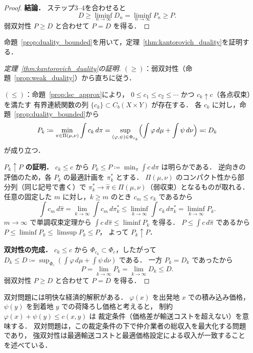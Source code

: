 \documentclass[uplatex, dvipdfmx]{jsarticle}
\begin{document}
\begin{proof}
\textbf{結論．}
ステップ3--4を合わせると
\[
  D \ge \liminf_{n\to\infty} D_n
  = \liminf_{n\to\infty} P_n
  \ge P.
\]
弱双対性 $P\ge D$ と合わせて $P=D$ を得る．
\end{proof}

命題~\ref{prop:duality_bounded}を用いて，定理~\ref{thm:kantorovich_duality}を証明する．

\begin{proof}[定理~\ref{thm:kantorovich_duality}の証明]
$(\ge)$：弱双対性（命題~\ref{prop:weak_duality}）から直ちに従う．

$(\le)$：命題~\ref{prop:lsc_approx}により，
$0\le c_1\le c_2\le\cdots$ かつ $c_k\uparrow c$（各点収束）を満たす
有界連続関数の列 $\{c_k\}\subset C_b(X\times Y)$ が存在する．
各 $c_k$ に対し，命題~\ref{prop:duality_bounded}から
\[
  P_k\coloneqq\min_{\pi\in\Pi(\mu,\nu)}\int c_k\,d\pi
  = \sup_{(\varphi,\psi)\in\Phi_{c_k}}
  \Bigl(\int\varphi\,d\mu+\int\psi\,d\nu\Bigr)
  \eqqcolon D_k
\]
が成り立つ．

\textbf{$P_k\uparrow P$ の証明．}
$c_k\le c$ から $P_k\le P\coloneqq\min_\pi\int c\,d\pi$ は明らかである．
逆向きの評価のため，各 $P_k$ の最適計画を $\pi_k^*$ とする．
$\Pi(\mu,\nu)$ のコンパクト性から部分列（同じ記号で書く）で
$\pi_k^*\to\hat{\pi}\in\Pi(\mu,\nu)$（弱収束）となるものが取れる．
任意の固定した $m$ に対し，$k\ge m$ のとき $c_m\le c_k$ であるから
\[
  \int c_m\,d\hat{\pi}
  = \lim_{k\to\infty}\int c_m\,d\pi_k^*
  \le \liminf_{k\to\infty}\int c_k\,d\pi_k^*
  = \liminf_{k\to\infty} P_k.
\]
$m\to\infty$ で単調収束定理から $\int c\,d\hat{\pi}\le\liminf P_k$ を得る．
$P\le\int c\,d\hat{\pi}$ であるから
$P\le\liminf P_k\le\limsup P_k\le P$，
よって $P_k\uparrow P$．

\textbf{双対性の完成．}
$c_k\le c$ から $\Phi_{c_k}\subset\Phi_c$，したがって
$D_k\le D\coloneqq\sup_{\Phi_c}(\int\varphi\,d\mu+\int\psi\,d\nu)$ である．
一方 $P_k=D_k$ であったから
\[
  P = \lim_{k\to\infty} P_k = \lim_{k\to\infty} D_k \le D.
\]
弱双対性 $P\ge D$ と合わせて $P=D$ を得る．
\end{proof}

双対問題には明快な経済的解釈がある．
$\varphi(x)$ を出発地 $x$ での積み込み価格，
$\psi(y)$ を到着地 $y$ での荷降ろし価格と考えると，
制約 $\varphi(x)+\psi(y)\le c(x,y)$ は
裁定条件（価格差が輸送コストを超えない）を意味する．
双対問題は，この裁定条件の下で仲介業者の総収入を最大化する問題であり，
強双対性は最適輸送コストと最適価格設定による収入が一致することを述べている．
\end{document}
